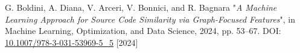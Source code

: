 


\begin{cvhonors}

\cvhonor
    {G. Boldini, A. Diana, V. Arceri, V. Bonnici, and R. Bagnara}
    {"\textit{A Machine Learning Approach for Source Code Similarity via Graph-Focused Features}",
     in Machine Learning, Optimization, and Data Science, 2024, pp. 53–67. 
     DOI: \href{https://doi.org/10.1007/978-3-031-53969-5_5}{10.1007/978-3-031-53969-5\_5}}
    {}
    {[2024]}

\end{cvhonors}